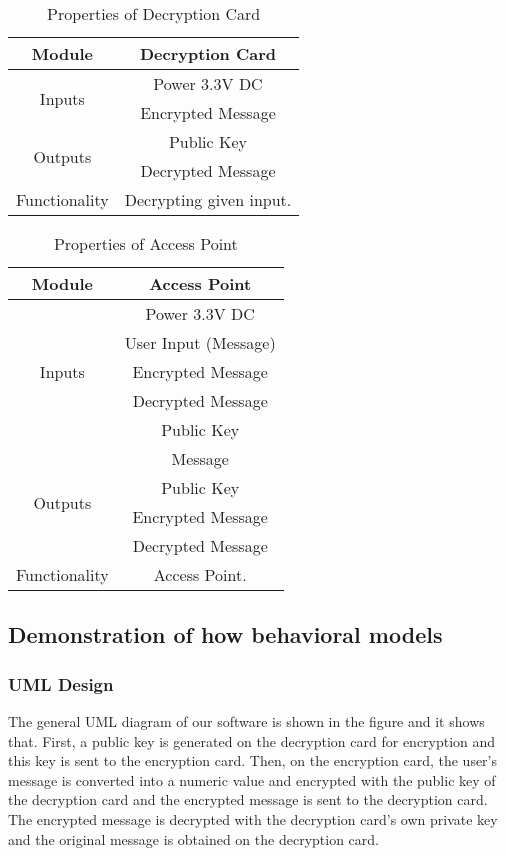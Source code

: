 \documentclass[12pt]{article}
\begin{document}
\begin{table}[h]
	\centering	
	\label{Properties of Decryption Card }
	\begin{tabular}{|c|c|}
	\hline
	Module & Decryption Card\\ \hline
		\multirow{2}{*}{Inputs} & Power 3.3V DC \\ \cline{2-2}
	& Encrypted Message \\ \hline
		\multirow{2}{*}{Outputs} & Public Key \\ \cline{2-2}
	& Decrypted Message \\ \hline
	Functionality & Decrypting given input.\\ \hline	
		
	\end{tabular}
	\caption{Properties of Decryption Card}
\end{table}
	\begin{table}[h]
		\centering		
		\label{Properties of Access Point }
		\begin{tabular}{|c|c|}
			\hline
			Module & Access Point \\ \hline
			\multirow{5}{*}{Inputs} & Power 3.3V DC \\
			\cline{2-2}
			& User Input (Message) \\
			\cline{2-2}
				& Encrypted Message \\
			\cline{2-2}
				& Decrypted Message \\
			\cline{2-2}
				& Public Key \\
			\cline{2-2} \hline
			
				\multirow{4}{*}{Outputs} & Message\\
			\cline{2-2}
			& Public Key \\
			\cline{2-2}
			& Encrypted Message \\
			\cline{2-2}
			& Decrypted Message \\
			\cline{2-2} \hline
			
			Functionality & Access Point.\\ \hline	
			
		\end{tabular}
		\caption{Properties of Access Point}
	\end{table}



\vskip 10cm
	\subsection{Demonstration of how behavioral models}
	\subsubsection{UML Design}
 	The general UML diagram of our software is shown in the figure and it shows that. First, a public key is generated on the decryption card for encryption and this key is sent to the encryption card. Then, on the encryption card, the user's message is converted into a numeric value and encrypted with the public key of the decryption card and the encrypted message is sent to the decryption card. The encrypted message is decrypted with the decryption card's own private key and the original message is obtained on the decryption card.
 	
\end{document}
